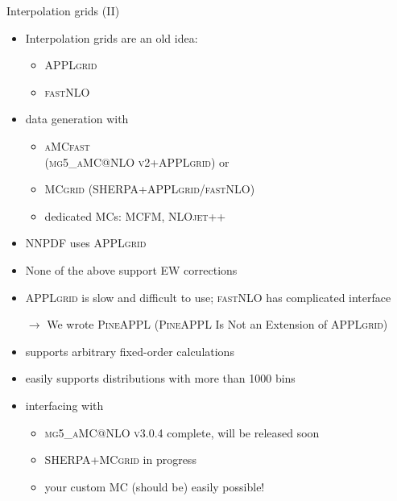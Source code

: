 \begin{frame}{Interpolation grids (II)}
\fontsize{9}{11}\selectfont
\begin{itemize}
\item Interpolation grids are an old idea:
\begin{itemize}
\item \textrm{\textsc{APPLgrid}} 
\item \textrm{\textsc{fastNLO}} 
\end{itemize}
\item data generation with
\begin{itemize}
\item \textrm{\textsc{aMCfast}}  \\
(\textrm{\textsc{mg5\_aMC@NLO v2+APPLgrid}}) or
\item \textrm{\textsc{MCgrid}}  %
(\textrm{\textsc{SHERPA+APPLgrid/fastNLO}})
\item dedicated MCs: \textrm{\textsc{MCFM}}, \textrm{\textsc{NLOjet++}}
\end{itemize}
\item NNPDF uses \textrm{\textsc{APPLgrid}}
\item None of the above support EW corrections
\item \textrm{\textsc{APPLgrid}} is slow and difficult to use; \textrm{\textsc{fastNLO}} has complicated interface
\end{itemize}

\vspace*{\fill}

\begin{itemize}
\item[$\rightarrow$] We wrote \textrm{\textsc{PineAPPL}} (\textrm{\textsc{PineAPPL}} Is Not an Extension of \textrm{\textsc{APPLgrid}})
\item supports arbitrary fixed-order calculations
\item easily supports distributions with more than 1000 bins
\item interfacing with
\begin{itemize}
\item \textrm{\textsc{mg5\_aMC@NLO v3.0.4}} complete, will be released soon
\item \textrm{\textsc{SHERPA+MCgrid}} in progress
\item your custom MC (should be) easily possible!
\end{itemize}
\end{itemize}
\end{frame}

